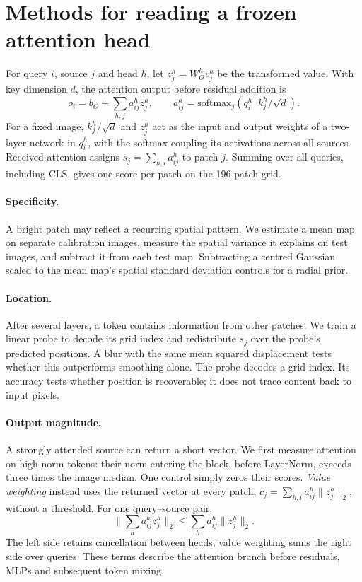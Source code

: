 \documentclass{article}
\begin{document}
\section{Methods for reading a frozen attention head}
\label{sec:method}
For query $i$, source $j$ and head $h$, let $z_j^h=W_O^h v_j^h$ be the transformed value. With key dimension $d$, the attention output before residual addition is
\begin{equation}
 o_i=b_O+\sum_{h,j}a^h_{ij}z^h_j,\qquad
 a^h_{ij}=\mathrm{softmax}_j(q_i^{h\top}k_j^h/\sqrt{d}).
\label{eq:attn}
\end{equation}
For a fixed image, $k_j^h/\sqrt d$ and $z_j^h$ act as the input and output weights of a two-layer network in $q_i^h$, with the softmax coupling its activations across all sources. Received attention assigns $s_j=\sum_{h,i}a^h_{ij}$ to patch $j$. Summing over all queries, including CLS, gives one score per patch on the 196-patch grid.

\paragraph{Specificity.} A bright patch may reflect a recurring spatial pattern. We estimate a mean map on separate calibration images, measure the spatial variance it explains on test images, and subtract it from each test map. Subtracting a centred Gaussian scaled to the mean map's spatial standard deviation controls for a radial prior.

\paragraph{Location.} After several layers, a token contains information from other patches. We train a linear probe to decode its grid index and redistribute $s_j$ over the probe's predicted positions. A blur with the same mean squared displacement tests whether this outperforms smoothing alone. The probe decodes a grid index. Its accuracy tests whether position is recoverable; it does not trace content back to input pixels.

\paragraph{Output magnitude.} A strongly attended source can return a short vector. We first measure attention on high-norm tokens: their norm entering the block, before LayerNorm, exceeds three times the image median. One control simply zeros their scores. \emph{Value weighting} instead uses the returned vector at every patch, $c_j=\sum_{h,i}a_{ij}^h\|z_j^h\|_2$, without a threshold. For one query--source pair,
\[
 \Big\|\sum_h a^h_{ij} z_j^h\Big\|_2 \leq \sum_h a^h_{ij}\|z_j^h\|_2.
\]
The left side retains cancellation between heads; value weighting sums the right side over queries. These terms describe the attention branch before residuals, MLPs and subsequent token mixing.
\clearpage
\end{document}
